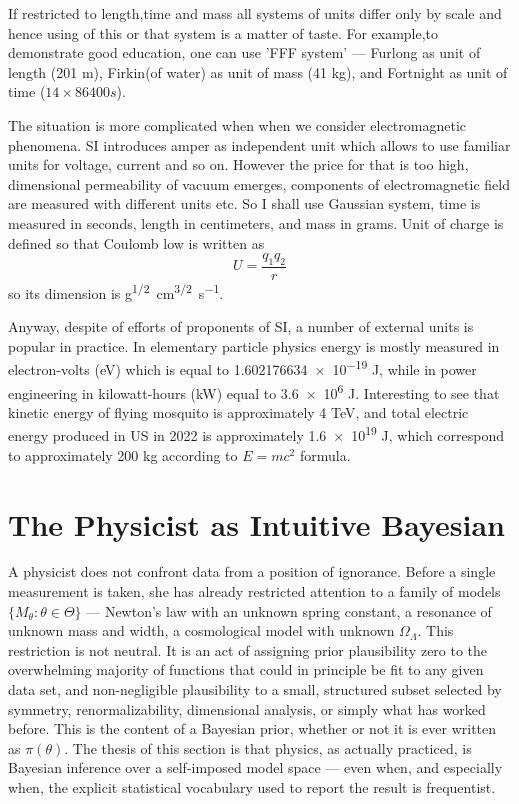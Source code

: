 If restricted to length,time and mass all systems of units  differ only by
scale and hence using of this or that system is a matter of taste. For
example,to demonstrate good education, one can use 'FFF system' --- Furlong as
unit of length (201 m), Firkin(of water) as unit of mass (41 kg), and Fortnight
as unit of time ($ 14\times 86400 s $). 

The situation is more complicated when when we consider electromagnetic
phenomena. SI introduces amper as independent unit which allows to use familiar
units for voltage, current and so on. However the price for that is too high,
dimensional permeability of vacuum emerges, components of electromagnetic field
are measured with different units etc. So I shall use Gaussian system, time is
measured in seconds, length in centimeters, and mass in grams. Unit of charge
is defined so that Coulomb low is written as \[ U= \frac{q_1 q_2}{r} \] so its
dimension is \unit{g^{1/2}.cm^{3/2}.s^{-1}}. 

Anyway, despite of efforts of proponents of SI, a number of external units is
popular in practice. In elementary particle physics energy is mostly measured
in electron-volts (\unit{eV}) which is equal to  \num{1.602176634e-19} J, while
in power engineering  in kilowatt-hours (\unit{kW}) equal to \num{3.6e6} J.
Interesting to see that kinetic energy of flying mosquito is approximately 4
\unit{TeV}, and total electric energy produced in US in 2022 is approximately
\num{1.6e19} J, which correspond to approximately 200 \unit{kg} according to $
E=m c^2 $ formula.

\section{The Physicist as Intuitive Bayesian}
\label{rm:pib}

A physicist does not confront data from a position of ignorance. Before a
single measurement is taken, she has already restricted attention to a family
of models $\{M_\theta : \theta \in \Theta\}$ --- Newton's law with an unknown
spring constant, a resonance of unknown mass and width, a cosmological model
with unknown $\Omega_\Lambda$. This restriction is not neutral. It is an act of
assigning prior plausibility zero to the overwhelming majority of functions
that could in principle be fit to any given data set, and non-negligible
plausibility to a small, structured subset selected by symmetry,
renormalizability, dimensional analysis, or simply what has worked before. This
is the content of a Bayesian prior, whether or not it is ever written as
$\pi(\theta)$. The thesis of this section is that physics, as actually
practiced, is Bayesian inference over a self-imposed model space --- even when,
and especially when, the explicit statistical vocabulary used to report the
result is frequentist.


